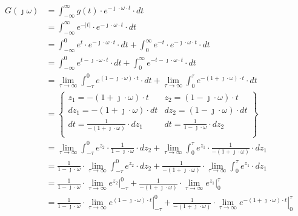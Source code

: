 \begin{task}
\begin{align*}
G(\jmath \omega)&=\int_{-\infty}^{\infty} g(t) \cdot e^{-\jmath \cdot \omega \cdot t} \cdot dt\\
&=\int_{-\infty}^{\infty} e^{-\left|t\right|} \cdot e^{-\jmath \cdot \omega \cdot t}\cdot dt\\
&=\int_{-\infty}^{0} e^{t} \cdot e^{-\jmath \cdot \omega \cdot t}\cdot dt + \int_{0}^{\infty} e^{-t} \cdot e^{-\jmath \cdot \omega \cdot t}\cdot dt\\
&=\int_{-\infty}^{0} e^{t -\jmath \cdot \omega \cdot t}\cdot dt + \int_{0}^{\infty} e^{-t -\jmath \cdot \omega \cdot t}\cdot dt\\
&=\lim_{\tau \rightarrow \infty} \int_{-\tau}^{0} e^{\left(1-\jmath \cdot \omega \right)\cdot t}\cdot dt + \lim_{\tau \rightarrow \infty} \int_{0}^{\tau} e^{-\left(1 +\jmath \cdot \omega \right)\cdot t}\cdot dt\\
&=\begin{Bmatrix}
z_1=-\left(1+\jmath \cdot \omega \right)\cdot t & z_2 = \left(1-\jmath \cdot \omega \right)\cdot t\\
dz_1=-\left(1+\jmath \cdot \omega \right)\cdot dt & dz_2 = \left(1-\jmath \cdot \omega \right)\cdot dt\\
dt=\frac{1}{-\left(1+\jmath \cdot \omega \right)}\cdot dz_1 & dt = \frac{1}{1-\jmath \cdot \omega}\cdot dz_2\\
\end{Bmatrix}\\
&=\lim_{\tau \rightarrow \infty} \int_{-\tau}^{0} e^{z_2}\cdot \frac{1}{1-\jmath \cdot \omega }\cdot dz_2 + \lim_{\tau \rightarrow \infty} \int_{0}^{\tau} e^{z_1}\cdot \frac{1}{-\left(1+\jmath \cdot \omega\right)}\cdot dz_1\\
&=\frac{1}{1-\jmath \cdot \omega }\cdot \lim_{\tau \rightarrow \infty} \int_{-\tau}^{0} e^{z_2}\cdot dz_2 + \frac{1}{-\left(1+\jmath \cdot \omega\right)}\cdot \lim_{\tau \rightarrow \infty} \int_{0}^{\tau} e^{z_1}\cdot  dz_1\\
&=\frac{1}{1-\jmath \cdot \omega}\cdot \lim_{\tau \rightarrow \infty} \left. e^{z_2}\right|_{-\tau}^{0} + \frac{1}{-\left(1+\jmath \cdot \omega\right)}\cdot \lim_{\tau \rightarrow \infty} \left. e^{z_1}\right|_{0}^{\tau}\\
&=\frac{1}{1-\jmath \cdot \omega }\cdot \lim_{\tau \rightarrow \infty} \left. e^{\left(1-\jmath \cdot \omega \right)\cdot t}\right|_{-\tau}^{0} + \frac{1}{-\left(1+\jmath \cdot \omega\right)}\cdot \lim_{\tau \rightarrow \infty} \left. e^{-\left(1+\jmath \cdot \omega \right)\cdot t}\right|_{0}^{\tau}\\

\end{align*}
\end{task}
